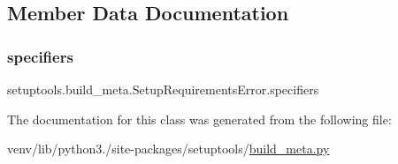 \subsection{Member Data Documentation}
\mbox{\label{classsetuptools_1_1build__meta_1_1SetupRequirementsError_ab8d760d963fece58db336de3d5444615}} 
\subsubsection{\texorpdfstring{specifiers}{specifiers}}
{\footnotesize\ttfamily setuptools.\+build\+\_\+meta.\+Setup\+Requirements\+Error.\+specifiers}



The documentation for this class was generated from the following file\+:\begin{DoxyCompactItemize}
\item 
venv/lib/python3./site-\/packages/setuptools/\hyperlink{build__meta_8py}{build\+\_\+meta.\+py}\end{DoxyCompactItemize}
